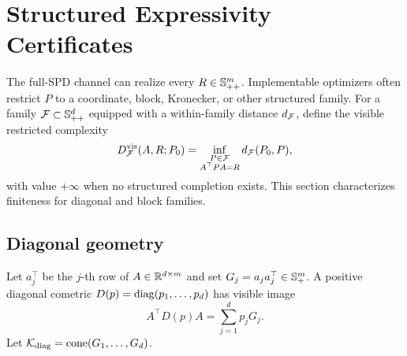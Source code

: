 \section{Structured Expressivity Certificates}
\label{sec:structured-expressivity}

The full-SPD channel can realize every \(R\in\mathbb S_{++}^m\).  Implementable
optimizers often restrict \(P\) to a coordinate, block, Kronecker, or other
structured family.  For a family \(\mathcal F\subset\mathbb S_{++}^d\) equipped with a
within-family distance \(d_\mathcal F\), define the visible restricted complexity
\begin{equation}
  D_{\mathcal F}^{\mathrm{vis}}(A,R;P_0)
  =
  \inf_{\substack{P\in\mathcal F\\A^\top PA=R}}d_\mathcal F(P_0,P),
  \label{eq:visible-restricted-complexity}
\end{equation}
with value \(+\infty\) when no structured completion exists.  This section
characterizes finiteness for diagonal and block families.

\subsection{Diagonal geometry}

Let \(a_j^\top\) be the \(j\)-th row of \(A\in\mathbb R^{d\times m}\) and set
\(G_j=a_ja_j^\top\in\mathbb S_{+}^m\).  A positive diagonal cometric
\(D(p)=\operatorname{diag}(p_1,\ldots,p_d)\) has visible image
\begin{equation}
  A^\top D(p)A=\sum_{j=1}^d p_jG_j.
  \label{eq:diagonal-image}
\end{equation}
Let \(\mathcal K_{\mathrm{diag}}=\operatorname{cone}(G_1,\ldots,G_d)\).

